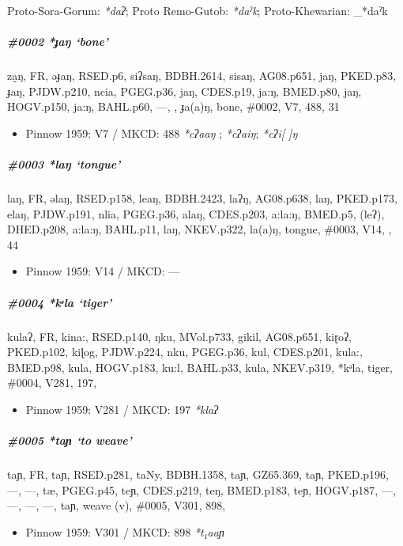 \documentclass[a4paper,]{article}
\providecommand{\tightlist}{%
  \setlength{\itemsep}{0pt}\setlength{\parskip}{0pt}}
\let\oldsubparagraph\subparagraph
\renewcommand{\subparagraph}[1]{\oldsubparagraph{#1}\mbox{}}
\begin{document}
Proto-Sora-Gorum: \emph{*daʔ}; Proto Remo-Gutob: \emph{*daˀk};
Proto-Khewarian: \_*daˀk

\subparagraph{\texorpdfstring{\#0002 \emph{*ɟaŋ}
`bone'}{\#0002 *ɟaŋ bone}}\label{ux25faux14b-bone}

za̰ŋ, FR, əɟaŋ, RSED.p6, siʔsaŋ, BDBH.2614, sisaŋ, AG08.p651, jaŋ,
PKED.p83, ɟaŋ, PJDW.p210, ncia, PGEG.p36, jaŋ, CDES.p19, ja:ŋ, BMED.p80,
jaŋ, HOGV.p150, ja:ŋ, BAHL.p60, ---, , ɟa(a)ŋ, bone, \#0002, V7, 488, 31

\begin{itemize}
\tightlist
\item
  Pinnow 1959: V7 / MKCD: 488 \emph{*cʔaaŋ} ; \emph{*cʔaiŋ};
  \emph{*cʔi{[} {]}ŋ}
\end{itemize}

\subparagraph{\texorpdfstring{\#0003 \emph{*laŋ}
`tongue'}{\#0003 *laŋ tongue}}\label{laux14b-tongue}

laŋ, FR, əlaŋ, RSED.p158, leaŋ, BDBH.2423, laʔŋ, AG08.p638, laŋ,
PKED.p173, elaŋ, PJDW.p191, nlia, PGEG.p36, alaŋ, CDES.p203, a:la:ŋ,
BMED.p5, (leʔ), DHED.p208, a:la:ŋ, BAHL.p11, laŋ, NKEV.p322, la(a)ŋ,
tongue, \#0003, V14, , 44

\begin{itemize}
\tightlist
\item
  Pinnow 1959: V14 / MKCD: ---
\end{itemize}

\subparagraph{\texorpdfstring{\#0004 \emph{*kᵊla}
`tiger'}{\#0004 *kᵊla tiger}}\label{kux1d4ala-tiger-1}

kulaʔ, FR, kina:, RSED.p140, ŋku, MVol.p733, gikil, AG08.p651, kiɽoʔ,
PKED.p102, kiɭog, PJDW.p224, nku, PGEG.p36, kul, CDES.p201, kula:,
BMED.p98, kula, HOGV.p183, ku:l, BAHL.p33, kula, NKEV.p319, *kᵊla,
tiger, \#0004, V281, 197,

\begin{itemize}
\tightlist
\item
  Pinnow 1959: V281 / MKCD: 197 \emph{*klaʔ}
\end{itemize}

\subparagraph{\texorpdfstring{\#0005 \emph{*taɲ} `to
weave'}{\#0005 *taɲ to weave}}\label{taux272-to-weave}

taɲ, FR, taɲ, RSED.p281, taNy, BDBH.1358, taɲ, GZ65.369, taɲ, PKED.p196,
---, ---, tæ, PGEG.p45, teɲ, CDES.p219, teŋ, BMED.p183, teɲ, HOGV.p187,
---, ---, ---, ---, taɲ, weave (v), \#0005, V301, 898,

\begin{itemize}
\tightlist
\item
  Pinnow 1959: V301 / MKCD: 898 \emph{*t₁aaɲ}
\end{itemize}
\end{document}

